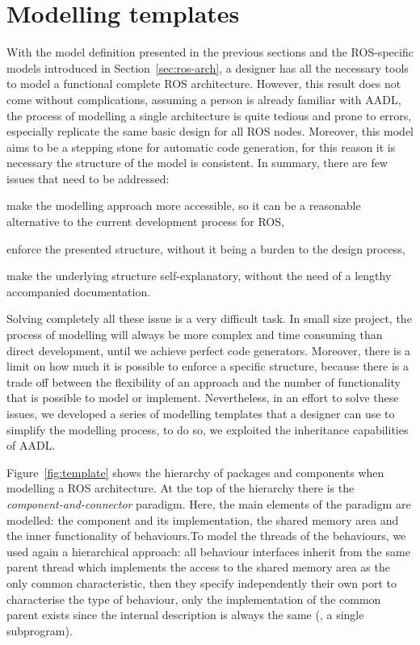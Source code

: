 \section{Modelling templates}
\label{sec:template}
With the model definition presented in the previous sections and the ROS-specific models introduced in Section~\ref{sec:ros-arch}, a designer has all the necessary tools to model a functional complete ROS architecture. However, this result does not come without complications, assuming a person is already familiar with AADL, the process of modelling a single architecture is quite tedious and prone to errors, especially replicate the same basic design for all ROS nodes. Moreover, this model aims to be a stepping stone for automatic code generation, for this reason it is necessary the structure of the model is consistent. In summary, there are few issues that need to be addressed:
\begin{enumerate*}[label={\alph*)}]
\item make the modelling approach more accessible, so it can be a reasonable alternative to the current development process for ROS,
\item enforce the presented structure, without it being a burden to the design process,
\item make the underlying structure self-explanatory, without the need of a lengthy accompanied documentation.
\end{enumerate*}

Solving completely all these issue is a very difficult task. In small size project, the process of modelling will always be more complex and time consuming than direct development, until we achieve perfect code generators.  Moreover, there is a limit on how much it is possible to enforce a specific structure, because there is a trade off between the flexibility of an approach and the number of functionality that is possible to model or implement. Nevertheless, in an effort to solve these issues, we developed a series of modelling templates that a designer can use to simplify the modelling process, to do so, we exploited the inheritance capabilities of AADL.

Figure~\ref{fig:template} shows the hierarchy of packages and components when modelling a ROS architecture. At the top of the hierarchy there is the \textit{component-and-connector} paradigm. Here, the main elements of the paradigm are modelled: the component and its implementation, the shared memory area and the inner functionality of behaviours.To model the threads of the behaviours, we used again a hierarchical approach: all behaviour interfaces inherit from the same parent thread which implements the access to the shared memory area as the only common characteristic, then they specify independently their own port to characterise the type of behaviour, only the implementation of the common parent exists since the internal description is always the same (\ie, a single subprogram).

